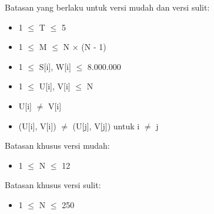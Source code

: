 \documentclass[../main_problemset.tex]{subfiles} %
\begin{document}
\begin{minipage}[t]{0.47\textwidth}
	
Batasan yang berlaku untuk versi mudah dan versi sulit:

\begin{itemize}
	\item 1 $ \leq $ T $ \leq $ 5
	\item 1 $ \leq $ M $ \leq $ N $ \times $ (N - 1)
	\item 1 $ \le $ S[i], W[i] $ \le $ 8.000.000
	\item 1 $ \le $ U[i], V[i] $ \le $ N
	\item U[i] $ \neq $ V[i]
	\item (U[i], V[i]) $ \neq $ (U[j], V[j]) untuk i $ \neq $ j
\end{itemize}
\end{minipage}
\begin{minipage}[t]{0.06\textwidth}
	\hfill
\end{minipage}
\begin{minipage}[t]{0.47\textwidth}
	Batasan khusus versi mudah:
	\begin{itemize}
		\item 1 $ \le $ N $ \le $ 12
	\end{itemize}
	
	\vspace{.2cm}
	
	Batasan khusus versi sulit:
	\begin{itemize}
		\item 1 $ \le $ N $ \le $ 250
	\end{itemize}
\end{minipage}
\end{document}
